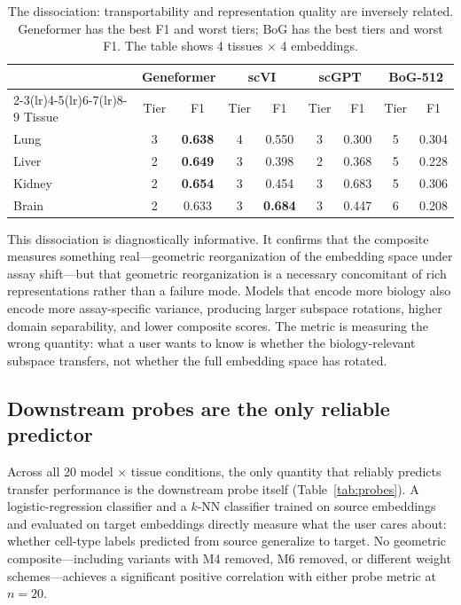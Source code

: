 \documentclass[9pt,lineno]{elife}
\begin{document}
\begin{table}[t]
\centering
\caption{The dissociation: transportability and representation quality are inversely related. Geneformer has the best F1 and worst tiers; BoG has the best tiers and worst F1. The table shows 4 tissues $\times$ 4 embeddings.}
\label{tab:dissociation}
\small
\begin{tabular}{@{}lcccccccc@{}}
\toprule
 & \multicolumn{2}{c}{Geneformer} & \multicolumn{2}{c}{scVI} & \multicolumn{2}{c}{scGPT} & \multicolumn{2}{c}{BoG-512} \\
\cmidrule(lr){2-3}\cmidrule(lr){4-5}\cmidrule(lr){6-7}\cmidrule(lr){8-9}
Tissue & Tier & F1 & Tier & F1 & Tier & F1 & Tier & F1 \\
\midrule
Lung   & 3 & \textbf{0.638} & 4 & 0.550 & 3 & 0.300 & 5 & 0.304 \\
Liver  & 2 & \textbf{0.649} & 3 & 0.398 & 2 & 0.368 & 5 & 0.228 \\
Kidney & 2 & \textbf{0.654} & 3 & 0.454 & 3 & 0.683 & 5 & 0.306 \\
Brain  & 2 & 0.633 & 3 & \textbf{0.684} & 3 & 0.447 & 6 & 0.208 \\
\bottomrule
\end{tabular}
\end{table}

This dissociation is diagnostically informative. It confirms that the composite measures something real---geometric reorganization of the embedding space under assay shift---but that geometric reorganization is a necessary concomitant of rich representations rather than a failure mode. Models that encode more biology also encode more assay-specific variance, producing larger subspace rotations, higher domain separability, and lower composite scores. The metric is measuring the wrong quantity: what a user wants to know is whether the biology-relevant subspace transfers, not whether the full embedding space has rotated.

\subsection{Downstream probes are the only reliable predictor}

Across all 20 model $\times$ tissue conditions, the only quantity that reliably predicts transfer performance is the downstream probe itself (Table~\ref{tab:probes}). A logistic-regression classifier and a $k$-NN classifier trained on source embeddings and evaluated on target embeddings directly measure what the user cares about: whether cell-type labels predicted from source generalize to target. No geometric composite---including variants with M4 removed, M6 removed, or different weight schemes---achieves a significant positive correlation with either probe metric at $n = 20$.
\end{document}
